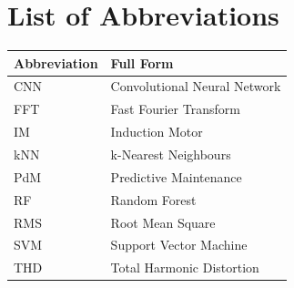 \chapter*{List of Abbreviations}
\begin{tabularx}{\textwidth}{@{}l X@{}}
\toprule
\textbf{Abbreviation} & \textbf{Full Form} \\
\midrule
CNN & Convolutional Neural Network \\
FFT & Fast Fourier Transform \\
IM  & Induction Motor \\
kNN & k-Nearest Neighbours \\
PdM & Predictive Maintenance \\
RF  & Random Forest \\
RMS & Root Mean Square \\
SVM & Support Vector Machine \\
THD & Total Harmonic Distortion \\
\bottomrule
\end{tabularx}

\clearpage
\pagestyle{fancy}

